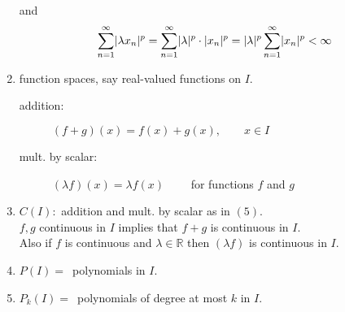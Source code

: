 \begin{beispiele}
\begin{enumerate}[1)]
		and \[
			\sum_{n=1}^{\infty} \lvert\lambda x_n\rvert^p = \sum_{n=1}^{\infty} \lvert\lambda\rvert^p \cdot \lvert x_n\rvert^p = \lvert\lambda\rvert^p \sum_{n=1}^{\infty}\lvert x_n\rvert^p < \infty
		\]
		\item function spaces, say real-valued functions on $I$.
		\begin{description}
			\item[addition:] $(f+g)(x) = f(x)+ g(x), \qquad x \in I$
			\item[mult. by scalar:] $(\lambda f)(x)= \lambda f(x) \qquad $ for functions $f$ and $g$ 
		\end{description}
		\item $C(I):$ addition and mult. by scalar as in $(5)$. \\ $f,g$ continuous in $I$ implies that $f+g$ is continuous in $I$. \\
		Also if $f$ is continuous and $\lambda \in \mathbb{R}$ then $(\lambda f)$ is continuous in $I$.
		\item $P(I)= \,$ polynomials in $I$.
		\item $P_k(I)= \,$ polynomials of degree at most $k$ in $I$.
	\end{enumerate}
\end{beispiele}

